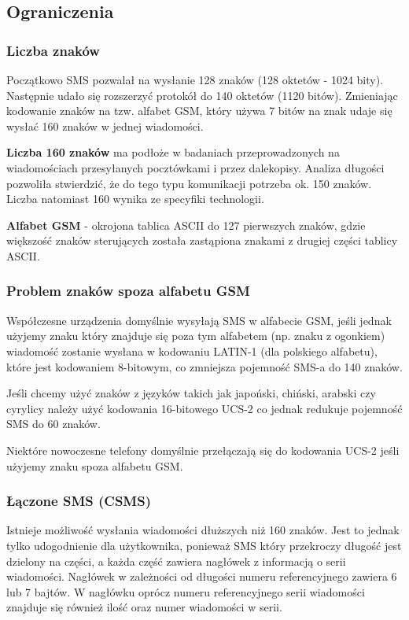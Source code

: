 \documentclass[xcolor=table]{beamer}
\begin{document}
\subsection{Ograniczenia}
\begin{frame}[allowframebreaks]
  \frametitle{Liczba znaków}

  Początkowo SMS pozwalał na wysłanie 128 znaków (128 oktetów - 1024 bity).
  Następnie udało się rozszerzyć protokół do 140 oktetów (1120 bitów).
  Zmieniając kodowanie znaków na tzw. alfabet GSM, który używa 7 bitów na znak
  udaje się wysłać 160 znaków w jednej wiadomości.

  \textbf{Liczba 160 znaków} ma podłoże w badaniach przeprowadzonych na
  wiadomościach przesyłanych pocztówkami i przez dalekopisy. Analiza długości
  pozwoliła stwierdzić, że do tego typu komunikacji potrzeba ok. 150 znaków.
  Liczba natomiast 160 wynika ze specyfiki technologii.

  \framebreak

  \textbf{Alfabet GSM} - okrojona tablica ASCII do 127 pierwszych znaków, gdzie
  większość znaków sterujących została zastąpiona znakami z drugiej części
  tablicy ASCII.

\end{frame}
\begin{frame}
  \frametitle{Problem znaków spoza alfabetu GSM}

  Współczesne urządzenia domyślnie wysyłają SMS w alfabecie GSM, jeśli jednak
  użyjemy znaku który znajduje się poza tym alfabetem (np. znaku z ogonkiem)
  wiadomość zostanie wysłana w kodowaniu LATIN-1 (dla polskiego alfabetu), które
  jest kodowaniem 8-bitowym, co zmniejsza pojemność SMS-a do 140 znaków.

  Jeśli chcemy użyć znaków z języków takich jak japoński, chiński, arabski czy
  cyrylicy należy użyć kodowania 16-bitowego UCS-2 co jednak redukuje pojemność
  SMS do 60 znaków.

  Niektóre nowoczesne telefony domyślnie przełączają się do kodowania UCS-2
  jeśli użyjemy znaku spoza alfabetu GSM.
\end{frame}

\begin{frame}
  \frametitle{Łączone SMS (CSMS)}

  Istnieje możliwość wysłania wiadomości dłuższych niż 160 znaków. Jest to
  jednak tylko udogodnienie dla użytkownika, ponieważ SMS który przekroczy
  długość jest dzielony na części, a każda część zawiera nagłówek z informacją
  o serii wiadomości. Nagłówek w zależności od długości numeru referencyjnego
  zawiera 6 lub 7 bajtów. W nagłówku oprócz numeru referencyjnego serii
  wiadomości znajduje się również ilość oraz numer wiadomości w serii.

\end{frame}
\end{document}

